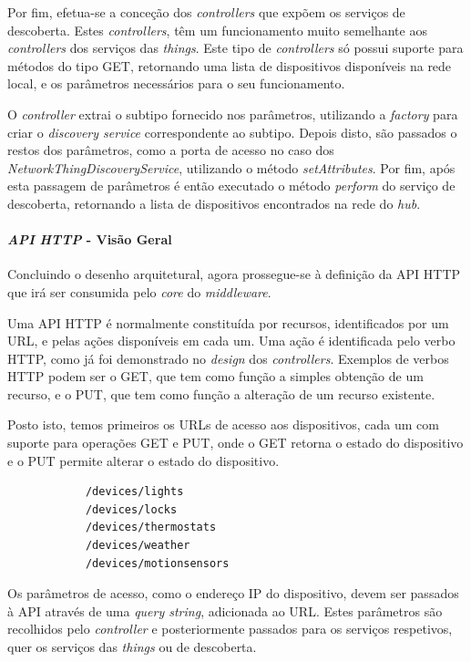 Por fim, efetua-se a conceção dos \textit{controllers} que expõem os serviços de descoberta. Estes \textit{controllers}, têm um funcionamento muito semelhante aos \textit{controllers} dos serviços das \textit{things}. Este tipo de \textit{controllers} só possui suporte para métodos do tipo GET, retornando uma lista de dispositivos disponíveis na rede local, e os parâmetros necessários para o seu funcionamento.


O \textit{controller} extrai o subtipo fornecido nos parâmetros, utilizando a \textit{factory} para criar o \textit{discovery service} correspondente ao subtipo. Depois disto, são passados o restos dos parâmetros, como a porta de acesso no caso dos \textit{NetworkThingDiscoveryService}, utilizando o método \textit{setAttributes}. Por fim, após esta passagem de parâmetros é então executado o método \textit{perform} do serviço de descoberta, retornando a lista de dispositivos encontrados na rede do \textit{hub}.

%
%
%
%

\paragraph*{\textit{API HTTP} - Visão Geral}

Concluindo o desenho arquitetural, agora prossegue-se à definição da API HTTP que irá ser consumida pelo \textit{core} do \textit{middleware}.

Uma API HTTP é normalmente constituída por recursos, identificados por um URL, e pelas ações disponíveis em cada um. Uma ação é identificada pelo verbo HTTP, como já foi demonstrado no \textit{design} dos \textit{controllers}. Exemplos de verbos HTTP podem ser o GET, que tem como função a simples obtenção de um recurso, e o PUT, que tem como função a alteração de um recurso existente.

Posto isto, temos primeiros os URLs de acesso aos dispositivos, cada um com suporte para operações GET e PUT, onde o GET retorna o estado do dispositivo e o PUT permite alterar o estado do dispositivo.

\begin{verbatim}
            /devices/lights
            /devices/locks
            /devices/thermostats
            /devices/weather
            /devices/motionsensors
\end{verbatim}

Os parâmetros de acesso, como o endereço IP do dispositivo, devem ser passados à API através de uma \textit{query string}, adicionada ao URL. Estes parâmetros são recolhidos pelo \textit{controller} e posteriormente passados para os serviços respetivos, quer os serviços das \textit{things} ou de descoberta.

